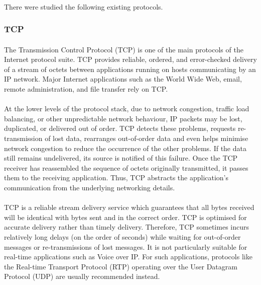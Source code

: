 \paragraph{}
There were studied the following existing protocols.

\subsubsection{TCP}
\paragraph{}
The Transmission Control Protocol (TCP) is one of the main protocols of the Internet protocol suite. TCP provides reliable, ordered, and error-checked delivery of a stream of octets between applications running on hosts communicating by an IP network. Major Internet applications such as the World Wide Web, email, remote administration, and file transfer rely on TCP.
\paragraph{}
At the lower levels of the protocol stack, due to network congestion, traffic load balancing, or other unpredictable network behaviour, IP packets may be lost, duplicated, or delivered out of order. TCP detects these problems, requests re-transmission of lost data, rearranges out-of-order data and even helps minimise network congestion to reduce the occurrence of the other problems. If the data still remains undelivered, its source is notified of this failure. Once the TCP receiver has reassembled the sequence of octets originally transmitted, it passes them to the receiving application. Thus, TCP abstracts the application's communication from the underlying networking details.
\paragraph{}
TCP is a reliable stream delivery service which guarantees that all bytes received will be identical with bytes sent and in the correct order. TCP is optimised for accurate delivery rather than timely delivery. Therefore, TCP sometimes incurs relatively long delays (on the order of seconds) while waiting for out-of-order messages or re-transmissions of lost messages. It is not particularly suitable for real-time applications such as Voice over IP. For such applications, protocols like the Real-time Transport Protocol (RTP) operating over the User Datagram Protocol (UDP) are usually recommended instead.

